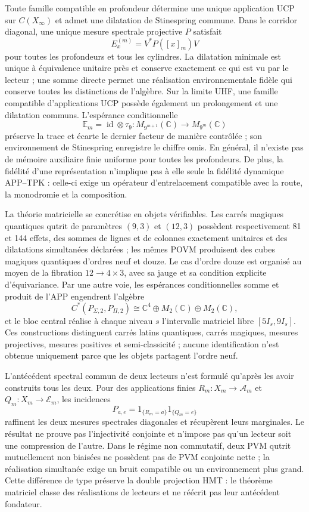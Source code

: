 Toute famille compatible en profondeur détermine une unique application UCP
sur \(C(X_\infty)\) et admet une dilatation de Stinespring commune. Dans le
corridor diagonal, une unique mesure spectrale projective \(P\) satisfait
\[
 E_x^{(m)}=V^*P([x]_m)V
\]
pour toutes les profondeurs et tous les cylindres. La dilatation minimale est
unique à équivalence unitaire près et conserve exactement ce qui est vu par le
lecteur ; une somme directe permet une réalisation environnementale fidèle qui conserve
toutes les distinctions de l'algèbre. Sur la limite UHF, une famille compatible
d'applications UCP possède également un prolongement et une dilatation communs.
L'espérance conditionnelle
\[
 \mathbb E_m=\operatorname{id}\otimes\tau_9:
 M_{9^{m+1}}(\mathbb C)\longrightarrow M_{9^m}(\mathbb C)
\]
préserve la trace et écarte le dernier facteur de manière contrôlée ; son environnement
de Stinespring enregistre le chiffre omis. En général, il n'existe pas de mémoire
auxiliaire finie uniforme pour toutes les profondeurs. De plus, la fidélité d'une
représentation n'implique pas à elle seule la fidélité dynamique APP--TPK : celle-ci
exige un opérateur d'entrelacement compatible avec la route, la monodromie et la composition.

La théorie matricielle se concrétise en objets vérifiables. Les carrés magiques
quantiques qutrit de paramètres \((9,3)\) et \((12,3)\) possèdent respectivement
81 et 144 effets, des sommes de lignes et de colonnes exactement unitaires et des
dilatations simultanées déclarées ; les mêmes POVM produisent des cubes magiques
quantiques d'ordres neuf et douze. Le cas d'ordre douze est organisé au moyen de
la fibration \(12\to4\times3\), avec sa jauge et sa condition explicite
d'équivariance. Par une autre voie, les espérances conditionnelles somme et produit de l'APP
engendrent l'algèbre
\[
 C^*(P_{\Sigma,2},P_{\Pi,2})
 \cong\mathbb C^4\oplus M_2(\mathbb C)\oplus M_2(\mathbb C),
\]
et le bloc central réalise à chaque niveau \(s\) l'intervalle matriciel libre
\([5I_s,9I_s]\). Ces constructions distinguent carrés latins quantiques,
carrés magiques, mesures projectives, mesures positives et semi-classicité ;
aucune identification n'est obtenue uniquement parce que les objets partagent l'ordre
neuf.

L'antécédent spectral commun de deux lecteurs n'est formulé qu'après
les avoir construits tous les deux. Pour des applications finies
\(R_m:X_m\to\mathcal A_m\) et \(Q_m:X_m\to\mathcal E_m\), les incidences
\[
 P_{a,e}=1_{\{R_m=a\}}1_{\{Q_m=e\}}
\]
raffinent les deux mesures spectrales diagonales et récupèrent leurs marginales. Le
résultat ne prouve pas l'injectivité conjointe et n'impose pas qu'un lecteur soit
une compression de l'autre. Dans le régime non commutatif, deux PVM qutrit mutuellement
non biaisées ne possèdent pas de PVM conjointe nette ; la réalisation simultanée exige
un bruit compatible ou un environnement plus grand. Cette différence de type préserve la
double projection HMT : le théorème matriciel classe des réalisations de lecteurs
et ne réécrit pas leur antécédent fondateur.

